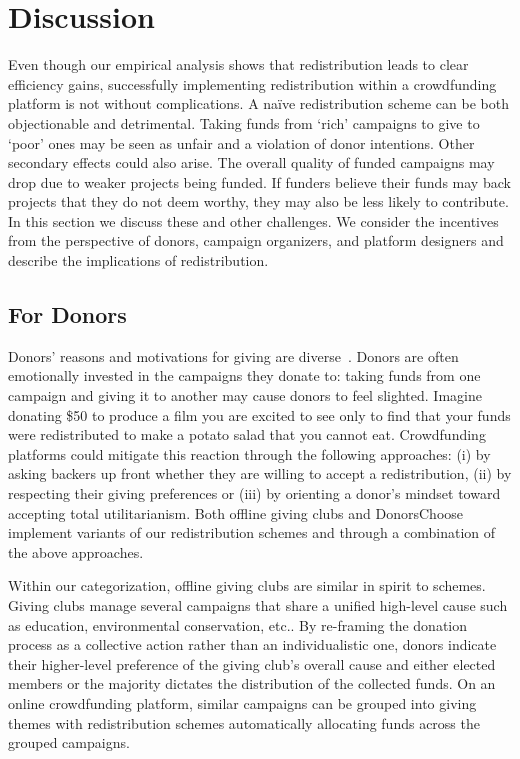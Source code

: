 \section{Discussion}
\label{sec:discussion}

Even though our empirical analysis shows that redistribution leads to clear efficiency gains, successfully implementing redistribution within a crowdfunding platform is not without complications.  A na\"ive redistribution scheme can be both objectionable and detrimental. Taking funds from `rich' campaigns to give to `poor' ones may be seen as unfair and a violation of donor intentions.  Other secondary effects could also arise. The overall quality of funded campaigns may drop due to weaker projects being funded. If funders believe their funds may back projects that they do not deem worthy, they may also be less likely to contribute. In this section we discuss these and other challenges. We consider the incentives from the perspective of donors, campaign organizers, and platform designers and describe the implications of redistribution. 

\subsection{For Donors}


Donors' reasons and motivations for giving are diverse~\cite{Gerber:2013:CMD:2562181.2530540}. 
Donors are often emotionally invested in the campaigns they donate to: 
taking funds from one campaign and giving it to another may cause donors to feel slighted. 
Imagine donating \$50 to produce a film you are excited to see only to find that your funds were redistributed to make a potato salad that you cannot eat. Crowdfunding platforms could mitigate this reaction through the following approaches: (i) by asking backers up front whether they are willing to accept a redistribution, (ii) by respecting their giving preferences or (iii) by orienting a donor's mindset toward accepting total utilitarianism. Both offline giving clubs and DonorsChoose implement variants of our redistribution schemes and through a combination of the above approaches.

Within our categorization, offline giving clubs are similar in spirit to \cpr schemes. Giving clubs manage several campaigns that share a unified high-level cause such as education, environmental conservation, etc.. By re-framing the donation process as a collective action rather than an individualistic one, donors indicate their higher-level preference of the giving club's overall cause and either elected members or the majority dictates the distribution of the collected funds. 
On an online crowdfunding platform, similar campaigns can be grouped into giving themes with redistribution schemes automatically allocating funds across the grouped campaigns.

